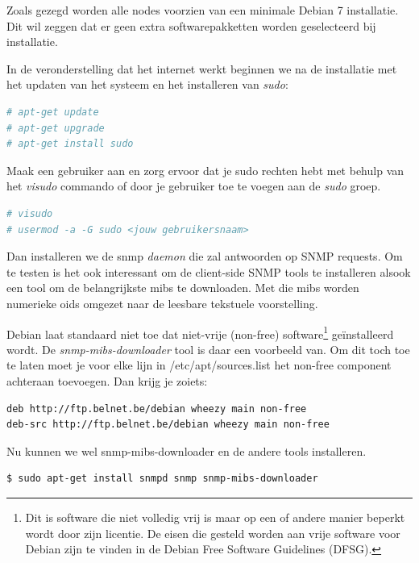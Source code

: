 Zoals gezegd worden alle nodes voorzien van een minimale Debian 7 installatie.
Dit wil zeggen dat er geen extra softwarepakketten worden geselecteerd bij installatie.

In de veronderstelling dat het internet werkt beginnen we na de installatie met het updaten van het systeem en het installeren van \textit{sudo}:

\begin{lstlisting}[language=bash]
# apt-get update
# apt-get upgrade
# apt-get install sudo
\end{lstlisting}

Maak een gebruiker aan en zorg ervoor dat je sudo rechten hebt met behulp van het \textit{visudo} commando of door je gebruiker toe te voegen aan de \textit{sudo} groep.

\begin{lstlisting}[language=bash]
# visudo
# usermod -a -G sudo <jouw gebruikersnaam>
\end{lstlisting}

Dan installeren we de snmp \textit{daemon} die zal antwoorden op SNMP requests.
Om te testen is het ook interessant om de client-side SNMP tools te installeren alsook een tool om de belangrijkste \glspl{mib} te downloaden.
Met die \glspl{mib} worden numerieke \glspl{oid} omgezet naar de leesbare tekstuele voorstelling.

Debian laat standaard niet toe dat niet-vrije (non-free) software\footnote{
	Dit is software die niet volledig vrij is maar op een of andere manier beperkt wordt door zijn licentie. De eisen die gesteld worden aan vrije software voor Debian zijn te vinden in de Debian Free Software Guidelines (DFSG)\cite{dfsg}\cite{dfsg-wiki}.}
geïnstalleerd wordt. De \textit{snmp-mibs-downloader} tool is daar een voorbeeld van.
Om dit toch toe te laten moet je voor elke lijn in /etc/apt/sources.list het non-free component achteraan toevoegen.
Dan krijg je zoiets:

\begin{lstlisting}[language=bash]
deb http://ftp.belnet.be/debian wheezy main non-free
deb-src http://ftp.belnet.be/debian wheezy main non-free
\end{lstlisting}

Nu kunnen we wel snmp-mibs-downloader en de andere tools installeren.

\begin{lstlisting}[language=bash]
$ sudo apt-get install snmpd snmp snmp-mibs-downloader
\end{lstlisting}

